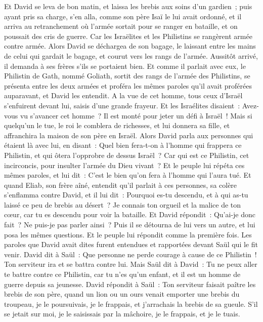 \begin{multicols}{2}
Et David se leva de bon matin, et laissa les brebis aux soins d'un gardien~; puis ayant pris sa charge, s'en alla, comme son père Isaï le lui avait ordonné, et il arriva au retranchement où l'armée sortait pour se ranger en bataille, et on poussait des cris de guerre.
Car les Israëlites et les Philistins se rangèrent armée contre armée.
Alors David se déchargea de son bagage, le laissant entre les mains de celui qui gardait le bagage, et courut vers les rangs de l'armée. Aussitôt arrivé, il demanda à ses frères s'ils se portaient bien.
Et comme il parlait avec eux, le Philistin de Gath, nommé Goliath, sortit des rangs de l'armée des Philistins, se présenta entre les deux armées et proféra les mêmes paroles qu'il avait proférées auparavant, et David les entendit.
A la vue de cet homme, tous ceux d'Israël s'enfuirent devant lui, saisis d'une grande frayeur.
Et les Israélites disaient~: Avez-vous vu s'avancer cet homme~? Il est monté pour jeter un défi à Israël~! Mais si quelqu'un le tue, le roi le comblera de richesses, et lui donnera sa fille, et affranchira la maison de son père en Israël.
Alors David parla aux personnes qui étaient là avec lui, en disant~: Quel bien fera-t-on à l'homme qui frappera ce Philistin, et qui ôtera l'opprobre de dessus Israël~? Car qui est ce Philistin, cet incirconcis, pour insulter l'armée du Dieu vivant~?
Et le peuple lui répéta ces mêmes paroles, et lui dit~: C'est le bien qu'on fera à l'homme qui l'aura tué.
Et quand Eliab, son frère aîné, entendit qu'il parlait à ces personnes, sa colère s'enflamma contre David, et il lui dit~: Pourquoi es-tu descendu, et à qui as-tu laissé ce peu de brebis au désert~? Je connais ton orgueil et la malice de ton cœur, car tu es descendu pour voir la bataille.
Et David répondit~: Qu'ai-je donc fait~? Ne puis-je pas parler ainsi~?
Puis il se détourna de lui vers un autre, et lui posa les mêmes questions. Et le peuple lui répondit comme la première fois.
Les paroles que David avait dites furent entendues et rapportées devant Saül qui le fit venir.
David dit à Saül~: Que personne ne perde courage à cause de ce Philistin~! Ton serviteur ira et se battra contre lui.
Mais Saül dit à David~: Tu ne peux aller te battre contre ce Philistin, car tu n'es qu'un enfant, et il est un homme de guerre depuis sa jeunesse.
David répondit à Saül~: Ton serviteur faisait paître les brebis de son père, quand un lion ou un ours venait emporter une brebis du troupeau,
je le poursuivais, je le frappais, et j'arrachais la brebis de sa gueule. S'il se jetait sur moi, je le saisissais par la mâchoire, je le frappais, et je le tuais.

\end{multicols}
